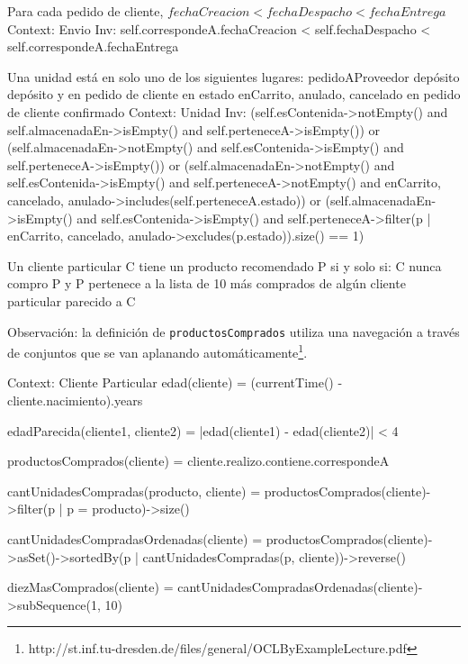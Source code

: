 \begin{listocl}
%
%
  \begin{itemocl}{Para cada pedido de cliente, $fechaCreacion < fechaDespacho < fechaEntrega$}
Context: Envio
Inv: self.correspondeA.fechaCreacion < self.fechaDespacho < self.correspondeA.fechaEntrega
  \end{itemocl}

%
%
  \begin{itemocl}{
      Una unidad está en solo uno de los siguientes lugares:
          pedidoAProveedor
          depósito
          depósito y en pedido de cliente en estado enCarrito, anulado, cancelado
          en pedido de cliente confirmado
    }
Context: Unidad
Inv:
(self.esContenida->notEmpty() and self.almacenadaEn->isEmpty() and self.perteneceA->isEmpty())
or
(self.almacenadaEn->notEmpty() and self.esContenida->isEmpty() and self.perteneceA->isEmpty())
or
(self.almacenadaEn->notEmpty() and self.esContenida->isEmpty() and self.perteneceA->notEmpty() and {enCarrito, cancelado, anulado}->includes(self.perteneceA.estado))
or
(self.almacenadaEn->isEmpty() and self.esContenida->isEmpty() and self.perteneceA->filter(p | {enCarrito, cancelado, anulado}->excludes(p.estado)).size() == 1)
  \end{itemocl}

%
%
  \begin{itemocl}{
      Un cliente particular C tiene un producto recomendado P si y solo si:
          C nunca compro P y
          P pertenece a la lista de 10 más comprados de algún cliente particular parecido a C

          Observación: la definición de \texttt{productosComprados} utiliza una navegación a través de conjuntos que se van aplanando automáticamente\footnote{http://st.inf.tu-dresden.de/files/general/OCLByExampleLecture.pdf}.
    }
  Context: Cliente Particular
  edad(cliente) = (currentTime() - cliente.nacimiento).years

  edadParecida(cliente1, cliente2) = |edad(cliente1) - edad(cliente2)| < 4

  productosComprados(cliente) = cliente.realizo.contiene.correspondeA

  cantUnidadesCompradas(producto, cliente) = productosComprados(cliente)->filter(p | p = producto)->size()

  cantUnidadesCompradasOrdenadas(cliente) = productosComprados(cliente)->asSet()->sortedBy(p | cantUnidadesCompradas(p, cliente))->reverse()

  diezMasComprados(cliente) = cantUnidadesCompradasOrdenadas(cliente)->subSequence(1, 10)


\end{itemocl}
\end{listocl}
